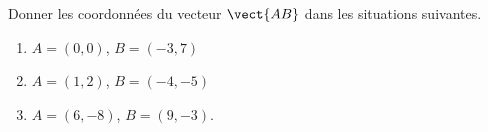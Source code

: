 
\begin{exercice}\label{exosmath-0332}

    Donner les coordonnées du vecteur \( \vect{ AB }\) dans les situations suivantes.
    \begin{enumerate}
        \item
            \( A=(0,0)\), \( B=(-3,7)\)
        \item
            \( A=(1,2)\), \( B=(-4,-5)\)
        \item
            \( A=(6,-8)\), \( B=(9,-3)\).
    \end{enumerate}

\end{exercice}
